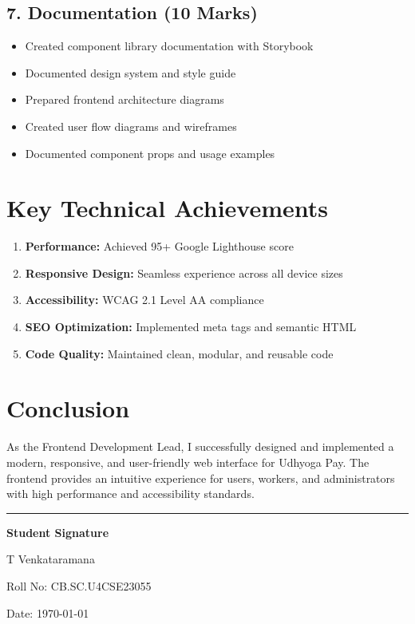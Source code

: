 \documentclass[12pt,a4paper]{article}
\begin{document}
\subsection*{7. Documentation (10 Marks)}
\begin{itemize}[leftmargin=*]
    \item Created component library documentation with Storybook
    \item Documented design system and style guide
    \item Prepared frontend architecture diagrams
    \item Created user flow diagrams and wireframes
    \item Documented component props and usage examples
\end{itemize}

\section*{Key Technical Achievements}

\begin{enumerate}[leftmargin=*]
    \item \textbf{Performance:} Achieved 95+ Google Lighthouse score
    \item \textbf{Responsive Design:} Seamless experience across all device sizes
    \item \textbf{Accessibility:} WCAG 2.1 Level AA compliance
    \item \textbf{SEO Optimization:} Implemented meta tags and semantic HTML
    \item \textbf{Code Quality:} Maintained clean, modular, and reusable code
\end{enumerate}

\section*{Conclusion}

As the Frontend Development Lead, I successfully designed and implemented a modern, responsive, and user-friendly web interface for Udhyoga Pay. The frontend provides an intuitive experience for users, workers, and administrators with high performance and accessibility standards.

\vspace{1cm}

\begin{center}
\rule{0.5\textwidth}{0.4pt}

\vspace{0.5cm}

\textbf{Student Signature}

\vspace{0.3cm}

T Venkataramana

Roll No: CB.SC.U4CSE23055

\vspace{0.5cm}

Date: \today
\end{center}
\end{document}
